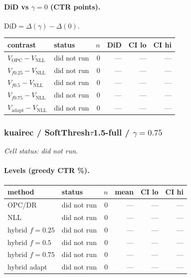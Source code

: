 \documentclass[10pt,a4paper]{article}
\begin{document}
\paragraph{DiD vs $\gamma=0$ (CTR points).} $\mathrm{DiD}=\Delta(\gamma)-\Delta(0)$.
{\centering\small\begin{tabular}{llrrrr}
\toprule contrast & status & $n$ & DiD & CI lo & CI hi \\
\midrule
$V_{\mathrm{OPC}}-V_{\mathrm{NLL}}$ & did not run & 0 & --- & --- & --- \\
$V_{f0.25}-V_{\mathrm{NLL}}$ & did not run & 0 & --- & --- & --- \\
$V_{f0.5}-V_{\mathrm{NLL}}$ & did not run & 0 & --- & --- & --- \\
$V_{f0.75}-V_{\mathrm{NLL}}$ & did not run & 0 & --- & --- & --- \\
$V_{\mathrm{adapt}}-V_{\mathrm{NLL}}$ & did not run & 0 & --- & --- & --- \\
\bottomrule\end{tabular}\par}
\bigskip
\subsubsection{kuairec / SoftThresh$\tau$1.5-full / $\gamma=0.75$}
\emph{Cell status: did not run}.
\paragraph{Levels (greedy CTR \%).}
{\centering\small\begin{tabular}{llrrrr}
\toprule method & status & $n$ & mean & CI lo & CI hi \\
\midrule
OPC/DR & did not run & 0 & --- & --- & --- \\
NLL & did not run & 0 & --- & --- & --- \\
hybrid $f{=}0.25$ & did not run & 0 & --- & --- & --- \\
hybrid $f{=}0.5$ & did not run & 0 & --- & --- & --- \\
hybrid $f{=}0.75$ & did not run & 0 & --- & --- & --- \\
hybrid adapt & did not run & 0 & --- & --- & --- \\
\bottomrule\end{tabular}\par}
\end{document}
